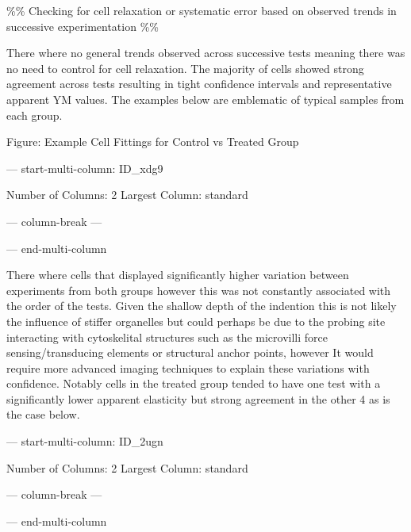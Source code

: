 \documentclass[
  paper=a4,
  ,captions=tableheading
]{scrartcl}
\newenvironment{Shaded}{}{}
\newcommand{\NormalTok}[1]{#1}
\begin{document}
\%\% Checking for cell relaxation or systematic error based on observed
trends in successive experimentation \%\%

There where no general trends observed across successive tests meaning
there was no need to control for cell relaxation. The majority of cells
showed strong agreement across tests resulting in tight confidence
intervals and representative apparent YM values. The examples below are
emblematic of typical samples from each group.

Figure: Example Cell Fittings for Control vs Treated Group

--- start-multi-column: ID\_xdg9

\begin{Shaded}
\begin{Highlighting}[]
\NormalTok{Number of Columns: 2}
\NormalTok{Largest Column: standard}
\end{Highlighting}
\end{Shaded}

{}

--- column-break ---

{}

--- end-multi-column

There where cells that displayed significantly higher variation between
experiments from both groups however this was not constantly associated
with the order of the tests. Given the shallow depth of the indention
this is not likely the influence of stiffer organelles but could perhaps
be due to the probing site interacting with cytoskelital structures such
as the microvilli force sensing/transducing elements or structural
anchor points, however It would require more advanced imaging techniques
to explain these variations with confidence. Notably cells in the
treated group tended to have one test with a significantly lower
apparent elasticity but strong agreement in the other 4 as is the case
below.

--- start-multi-column: ID\_2ugn

\begin{Shaded}
\begin{Highlighting}[]
\NormalTok{Number of Columns: 2}
\NormalTok{Largest Column: standard}
\end{Highlighting}
\end{Shaded}

{}

--- column-break ---

{}

--- end-multi-column
\end{document}
